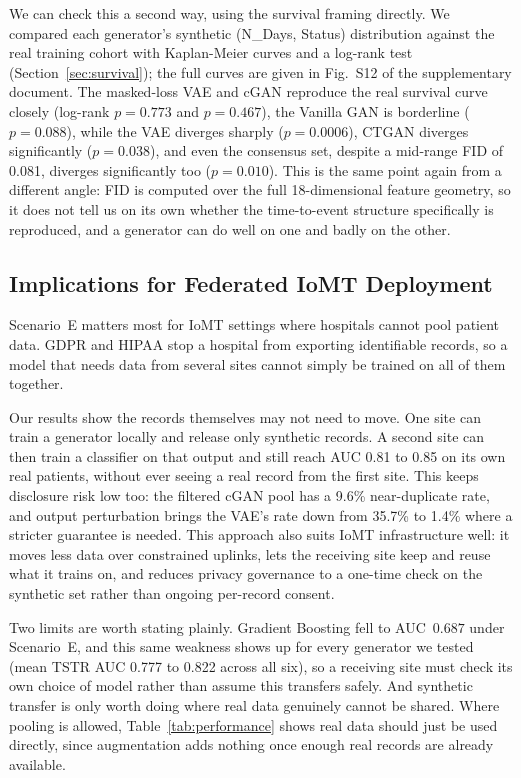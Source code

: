 \documentclass[journal]{IEEEtran}
\begin{document}
We can check this a second way, using the survival framing directly. We compared each generator's synthetic (N\_Days, Status) distribution against the real training cohort with Kaplan-Meier curves and a log-rank test (Section~\ref{sec:survival}); the full curves are given in Fig.~S12 of the supplementary document. The masked-loss VAE and cGAN reproduce the real survival curve closely (log-rank $p=0.773$ and $p=0.467$), the Vanilla GAN is borderline ($p=0.088$), while the VAE diverges sharply ($p=0.0006$), CTGAN diverges significantly ($p=0.038$), and even the consensus set, despite a mid-range FID of 0.081, diverges significantly too ($p=0.010$). This is the same point again from a different angle: FID is computed over the full 18-dimensional feature geometry, so it does not tell us on its own whether the time-to-event structure specifically is reproduced, and a generator can do well on one and badly on the other.

\subsection{Implications for Federated IoMT Deployment}
\label{sec:federated}

Scenario~E matters most for IoMT settings where hospitals cannot pool patient data. GDPR and HIPAA stop a hospital from exporting identifiable records, so a model that needs data from several sites cannot simply be trained on all of them together.

Our results show the records themselves may not need to move. One site can train a generator locally and release only synthetic records. A second site can then train a classifier on that output and still reach AUC 0.81 to 0.85 on its own real patients, without ever seeing a real record from the first site. This keeps disclosure risk low too: the filtered cGAN pool has a 9.6\% near-duplicate rate, and output perturbation brings the VAE's rate down from 35.7\% to 1.4\% where a stricter guarantee is needed. This approach also suits IoMT infrastructure well: it moves less data over constrained uplinks, lets the receiving site keep and reuse what it trains on, and reduces privacy governance to a one-time check on the synthetic set rather than ongoing per-record consent.

Two limits are worth stating plainly. Gradient Boosting fell to AUC~$0.687$ under Scenario~E, and this same weakness shows up for every generator we tested (mean TSTR AUC 0.777 to 0.822 across all six), so a receiving site must check its own choice of model rather than assume this transfers safely. And synthetic transfer is only worth doing where real data genuinely cannot be shared. Where pooling is allowed, Table~\ref{tab:performance} shows real data should just be used directly, since augmentation adds nothing once enough real records are already available.
\end{document}
